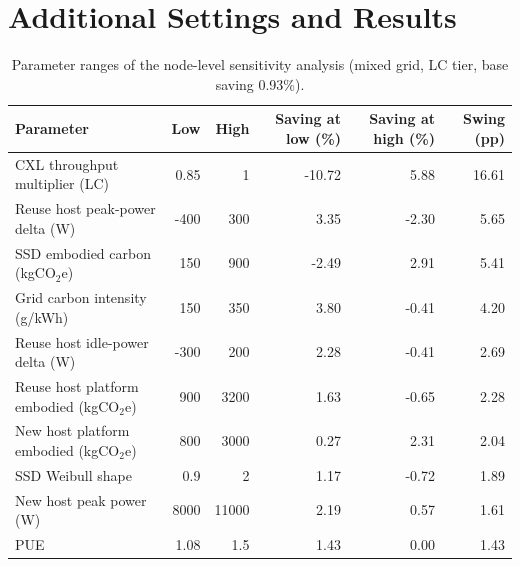 \documentclass[11pt]{article}
\begin{document}


\clearpage
\appendix
\section{Additional Settings and Results}
\label{app:extra}

\begin{table}[!htbp]
  \centering
  \caption{Parameter ranges of the node-level sensitivity analysis (mixed grid, LC tier, base saving 0.93\%).}
  \label{tab:ranges}
  \small
  \begin{tabular}{lrrrrr}
    \toprule
    Parameter & Low & High & Saving at low (\%) & Saving at high (\%) & Swing (pp) \\
    \midrule
    CXL throughput multiplier (LC) & 0.85 & 1 & -10.72 & 5.88 & 16.61 \\
    Reuse host peak-power delta (W) & -400 & 300 & 3.35 & -2.30 & 5.65 \\
    SSD embodied carbon (kgCO$_2$e) & 150 & 900 & -2.49 & 2.91 & 5.41 \\
    Grid carbon intensity (g/kWh) & 150 & 350 & 3.80 & -0.41 & 4.20 \\
    Reuse host idle-power delta (W) & -300 & 200 & 2.28 & -0.41 & 2.69 \\
    Reuse host platform embodied (kgCO$_2$e) & 900 & 3200 & 1.63 & -0.65 & 2.28 \\
    New host platform embodied (kgCO$_2$e) & 800 & 3000 & 0.27 & 2.31 & 2.04 \\
    SSD Weibull shape & 0.9 & 2 & 1.17 & -0.72 & 1.89 \\
    New host peak power (W) & 8000 & 11000 & 2.19 & 0.57 & 1.61 \\
    PUE & 1.08 & 1.5 & 1.43 & 0.00 & 1.43 \\
    \bottomrule
  \end{tabular}
\end{table}
\end{document}
